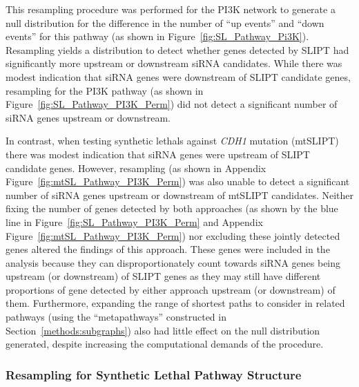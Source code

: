 This resampling procedure was performed for the \gls{PI3K} network to generate a null distribution for the difference in the number of ``up events'' and ``down events'' for this pathway (as shown in Figure~\ref{fig:SL_Pathway_Pi3K}). Resampling yields a distribution to detect whether genes detected by \gls{SLIPT} had significantly more upstream or downstream \gls{siRNA} candidates. While there was modest indication that \gls{siRNA} genes were downstream of \gls{SLIPT} candidate genes, resampling for the \gls{PI3K} pathway (as shown in Figure~\ref{fig:SL_Pathway_PI3K_Perm}) did not detect a significant number of \gls{siRNA} genes upstream or downstream.

In contrast, when testing \glspl{synthetic lethal} against \textit{CDH1} \gls{mutation} (\acrshort{mtSLIPT}) there was modest indication that \gls{siRNA} genes were upstream of \gls{SLIPT} candidate genes. However, resampling (as shown in Appendix Figure~\ref{fig:mtSL_Pathway_PI3K_Perm}) was also unable to detect a significant number of \gls{siRNA} genes upstream or downstream of \acrshort{mtSLIPT} candidates. Neither fixing the number of genes detected by both approaches (as shown by the blue line in Figure~\ref{fig:SL_Pathway_PI3K_Perm} and Appendix Figure~\ref{fig:mtSL_Pathway_PI3K_Perm}) nor excluding these jointly detected genes altered the findings of this approach. These genes were included in the analysis because they can disproportionately count towards \gls{siRNA} genes being upstream (or downstream) of \gls{SLIPT} genes as they may still have different proportions of gene detected by either approach upstream (or downstream) of them. Furthermore, expanding the range of \glspl{shortest path} to consider  in related pathways (using the ``metapathways'' constructed in Section~\ref{methods:subgraphs}) also had little effect on the null distribution generated, despite increasing the computational demands of the procedure.


\FloatBarrier

\subsubsection{Resampling for Synthetic Lethal Pathway Structure}  \label{chapt4:Structure_Perm}


